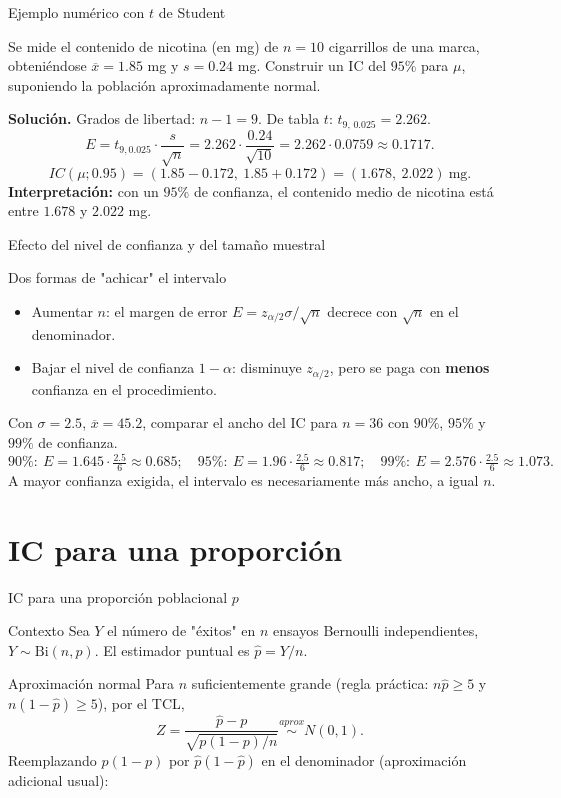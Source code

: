 \documentclass[aspectratio=169,11pt]{beamer}
\begin{document}
\begin{frame}{Ejemplo numérico con $t$ de Student}
\begin{example}
Se mide el contenido de nicotina (en mg) de $n=10$ cigarrillos de una marca, obteniéndose $\overline x = 1.85$ mg y $s=0.24$ mg. Construir un IC del $95\%$ para $\mu$, suponiendo la población aproximadamente normal.

\textbf{Solución.} Grados de libertad: $n-1=9$. De tabla $t$: $t_{9,\,0.025} = 2.262$.
\[
E = t_{9,0.025}\cdot\frac{s}{\sqrt n} = 2.262\cdot\frac{0.24}{\sqrt{10}} = 2.262\cdot 0.0759 \approx 0.1717.
\]
\[
IC(\mu;0.95) = (1.85-0.172,\ 1.85+0.172) = (1.678,\ 2.022)\ \text{mg}.
\]
\textbf{Interpretación:} con un $95\%$ de confianza, el contenido medio de nicotina está entre $1.678$ y $2.022$ mg.
\end{example}
\end{frame}

\begin{frame}{Efecto del nivel de confianza y del tamaño muestral}
\begin{block}{Dos formas de "achicar" el intervalo}
\begin{itemize}
\item Aumentar $n$: el margen de error $E=z_{\alpha/2}\sigma/\sqrt n$ decrece con $\sqrt n$ en el denominador.
\item Bajar el nivel de confianza $1-\alpha$: disminuye $z_{\alpha/2}$, pero se paga con \textbf{menos} confianza en el procedimiento.
\end{itemize}
\end{block}
\begin{example}
Con $\sigma=2.5$, $\overline x=45.2$, comparar el ancho del IC para $n=36$ con $90\%$, $95\%$ y $99\%$ de confianza.
\[
90\%:\ E=1.645\cdot\tfrac{2.5}{6}\approx 0.685; \quad
95\%:\ E=1.96\cdot\tfrac{2.5}{6}\approx 0.817; \quad
99\%:\ E=2.576\cdot\tfrac{2.5}{6}\approx 1.073.
\]
A mayor confianza exigida, el intervalo es necesariamente más ancho, a igual $n$.
\end{example}
\end{frame}

\section{IC para una proporción}

\begin{frame}{IC para una proporción poblacional $p$}
\begin{block}{Contexto}
Sea $Y$ el número de "éxitos" en $n$ ensayos Bernoulli independientes, $Y\sim \text{Bi}(n,p)$. El estimador puntual es $\widehat p = Y/n$.
\end{block}

\begin{block}{Aproximación normal}
Para $n$ suficientemente grande (regla práctica: $n\widehat p \ge 5$ y $n(1-\widehat p)\ge 5$), por el TCL,
\[
Z = \frac{\widehat p - p}{\sqrt{p(1-p)/n}} \overset{aprox}{\sim} N(0,1).
\]
Reemplazando $p(1-p)$ por $\widehat p(1-\widehat p)$ en el denominador (aproximación adicional usual):
\end{block}

\end{frame}
\end{document}
